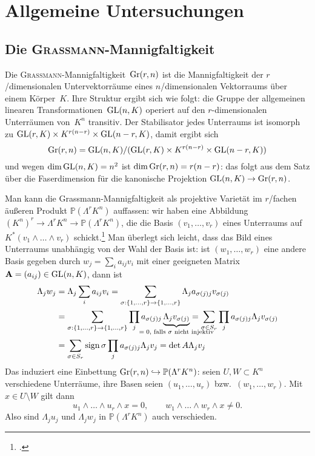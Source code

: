 \chapter{Allgemeine Untersuchungen} \label{chap:general}
\section{Die \textsc{Grassmann}-Mannigfaltigkeit} \label{sec:grassmann}
Die \textsc{Grassmann}-Mannigfaltigkeit~$\grass r/n$ ist die Mannigfaltigkeit der $r$\-/dimensionalen Untervektorräume eines $n$\-/dimensionalen Vektorraums über einem Körper~$K$. Ihre Struktur ergibt sich wie folgt: die Gruppe der allgemeinen linearen Transformationen~$\mathrm{GL}(n,K)$ operiert auf den $r$-dimensionalen Unterräumen von~$K^n$ transitiv. Der Stabilisator jedes Unterraums ist isomorph zu $\mathrm{GL}(r,K) \times K^{r(n-r)} \times \mathrm{GL}(n-r,K)$, damit ergibt sich
\begin{equation}
\grass r/n = \GL nK / (\GL rK \times K^{r(n-r)} \times \GL{n-r}K)
\end{equation}
und wegen $\dim \mathrm{GL}(n,K) = n^2$ ist $\dim \grass r/n = r(n-r)$: das folgt aus dem Satz über die Faserdimension für die kanonische Projektion $\GL nK \to \grass r/n$.

Man kann die Grassmann-Mannigfaltigkeit als projektive Varietät im $r$\-/fachen äußeren Produkt $\mathbb P(\Lambda^r K^n)$ auffassen: wir haben eine Abbildung $(K^n)^r \to \Lambda^r K^n \to \mathbb P(\Lambda^r K^n)$, die die Basis $(v_1, \dots, v_r)$ eines Unterraums auf $K^*(v_1 \wedge \dots \wedge v_r)$ schickt.\footcite[siehe hierzu auch][S.~42]{Shafarevich} Man überlegt sich leicht, dass das Bild eines Unterraums unabhängig von der Wahl der Basis ist: ist $(w_1, \dots, w_r)$ eine andere Basis gegeben durch $w_j = \sum_i a_{ij} v_i$ mit einer geeigneten Matrix $\mathbf{A} = (a_{ij}) \in \mathrm{GL}(n,K)$, dann ist
\begin{align*}
\Lambda_j w_j &= \Lambda_j \sum_i a_{ij} v_i = \sum_{\sigma: \{1,\dots,r\} \rightarrow \{1,\dots,r\}} \Lambda_j a_{\sigma(j)j} v_{\sigma(j)} \\
	&= \sum_{\sigma: \{1,\dots,r\} \rightarrow \{1,\dots,r\}} \prod_j a_{\sigma(j)j} \wunderbrace{\Lambda_j v_{\sigma(j)}}_{$= 0$, falls $\sigma$ nicht injektiv} = \sum_{\sigma \in S_r} \prod_j a_{\sigma(j)j} \Lambda_j v_{\sigma(j)} \\
	&= \sum_{\sigma \in S_r} \sign \sigma \prod_j a_{\sigma(j)j} \Lambda_j v_j = \det A \Lambda_j v_j
\end{align*}
Das induziert eine Einbettung $\grass r/n \into \mathbb P(\Lambda^r K^n)$: seien $U, W \subset K^n$ verschiedene Unterräume, ihre Basen seien $(u_1, \dots, u_r)$ bzw.~$(w_1, \dots, w_r)$. Mit~$x \in U \setminus W$ gilt dann
\begin{equation*}
u_1 \wedge \dots \wedge u_r \wedge x = 0, \qquad w_1 \wedge \dots \wedge w_r \wedge x \neq 0.
\end{equation*}
Also sind $\Lambda_j u_j$ und $\Lambda_j w_j$ in $\mathbb P(\Lambda^r K^n)$ auch verschieden.

